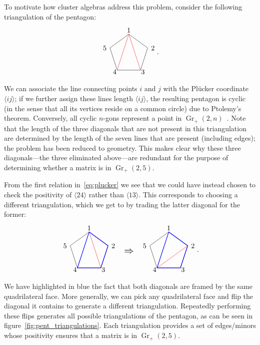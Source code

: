 \documentclass[11pt]{article}
\DeclareMathOperator{\Gr}{Gr}
\def\ket#1{\langle #1 \rangle}
\def\drawLabeledPentagon{
\coordinate (P1) at (90:1);
\coordinate (P2) at (18:1);
\coordinate (P3) at (306:1);
\coordinate (P4) at (234:1);
\coordinate (P5) at (162:1);
\draw (P1) -- (P2) -- (P3) -- (P4) -- (P5) -- cycle;
\draw (0,1.2) node {1};
\draw (1,.3) node[anchor=west] {2};
\draw (.5,-.9) node[anchor=west] {3};
\draw (-.5,-.9) node[anchor=east] {4};
\draw (-1,.3) node[anchor=east] {5};
}
\begin{document}
To motivate how cluster algebras address this problem, consider the following triangulation of the pentagon:
\begin{equation} \label{eq:pent_triangulation}
\begin{gathered}
\begin{tikzpicture}
  \drawLabeledPentagon
  \draw[color=red] (P1) -- (P3);
  \draw[color=red] (P1) -- (P4);
\end{tikzpicture} 
\end{gathered} .
\end{equation}
We can associate the line connecting points $i$ and $j$ with the Pl\"ucker coordinate $\ket{ij}$; if we further assign these lines length $\ket{ij}$, the resulting pentagon is cyclic (in the sense that all its vertices reside on a common circle) due to Ptolemy's theorem. Conversely, all cyclic $n$-gons represent a point in $\Gr_+(2,n)$~\cite{Arkani-Hamed:2014bca}. Note that the length of the three diagonals that are not present in this triangulation are determined by the length of the seven lines that are present (including edges); the problem has been reduced to geometry. This makes clear why these three diagonals---the three eliminated above---are redundant for the purpose of determining whether a matrix is in $\Gr_+(2,5)$. 

From the first relation in~\eqref{eq:plucker} we see that we could have instead chosen to check the positivity of $\ket{24}$ rather than $\ket{13}$. This corresponds to choosing a different triangulation, which we get to by trading the latter diagonal for the former:
\begin{equation}
\begin{gathered}
\begin{tikzpicture}
  \drawLabeledPentagon
  \draw[color=blue, thick] (P1) -- (P2) -- (P3) -- (P4) -- cycle;
  \draw[color=red] (P1) -- (P3);
  \draw (2,0) node {\scalebox{1.4}{$\Rightarrow$}};
\begin{scope}[xshift = 4cm]
  \drawLabeledPentagon
  \draw[color=blue, thick] (P1) -- (P2) -- (P3) -- (P4) -- cycle;
  \draw[color=red] (P2) -- (P4); 
\end{scope}
\end{tikzpicture}
\end{gathered}.  
\end{equation}
We have highlighted in blue the fact that both diagonals are framed by the same quadrilateral face. More generally, we can pick any quadrilateral face and flip the diagonal it contains to generate a different triangulation. Repeatedly performing these flips generates all possible triangulations of the pentagon, as can be seen in figure~\ref{fig:pent_triangulations}. Each triangulation provides a set of edges/minors whose positivity ensures that a matrix is in $\Gr_+(2,5)$. 
\end{document}
